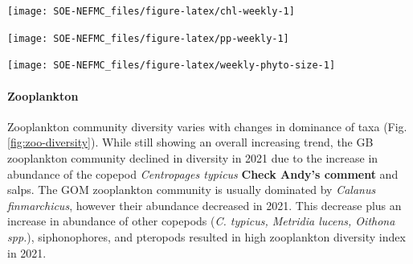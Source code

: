 \documentclass[
  10pt,
]{article}
\let\origfigure\figure
\let\endorigfigure\endfigure
\renewenvironment{figure}[1][2] {
    \expandafter\origfigure\expandafter[H]
} {
    \endorigfigure
}
\begin{document}
\begin{figure}

{\centering \texttt{[image: SOE-NEFMC\_files/figure-latex/chl-weekly-1]} 

}

\caption{Weekly chlorophyll concentrations on Georges Bank (GB) and in the Gulf of Maine (GOM) are shown by the colored line for 2022 (dashed portion indicates preliminary data from a near real-time satellite source). The long-term mean is shown in black and shading indicates +/- 1 sample SD.}\label{fig:chl-weekly}
\end{figure}

\begin{figure}

{\centering \texttt{[image: SOE-NEFMC\_files/figure-latex/pp-weekly-1]} 

}

\caption{Weekly primary productivity on Georges Bank (GB) and in the Gulf of Maine (GOM) are shown by the colored line for 2022 (dashed portion indicates preliminary data from a near real-time satellite source). The long-term mean is shown in black and shading indicates +/- 1 sample SD.}\label{fig:pp-weekly}
\end{figure}

\begin{figure}

{\centering \texttt{[image: SOE-NEFMC\_files/figure-latex/weekly-phyto-size-1]} 

}

\caption{The annual climatology (1998-2021) percent composition of the phytoplankton size classes on Georges Bank and Gulf of Maine based on satellite observations in the shaded portions. The 2022 proportions for the microplankton (>20 microns, green) and nanoplankton (2-20 microns, orange) are shown in the bold lines.}\label{fig:weekly-phyto-size}
\end{figure}

\hypertarget{zooplankton}{%
\paragraph{Zooplankton}\label{zooplankton}}

Zooplankton community diversity varies with changes in dominance of taxa (Fig. \ref{fig:zoo-diversity}). While still showing an overall increasing trend, the GB zooplankton community declined in diversity in 2021 due to the increase in abundance of the copepod \emph{Centropages typicus} \textbf{Check Andy's comment} and salps. The GOM zooplankton community is usually dominated by \emph{Calanus finmarchicus}, however their abundance decreased in 2021. This decrease plus an increase in abundance of other copepods (\emph{C. typicus, Metridia lucens, Oithona spp.}), siphonophores, and pteropods resulted in high zooplankton diversity index in 2021.
\end{document}
